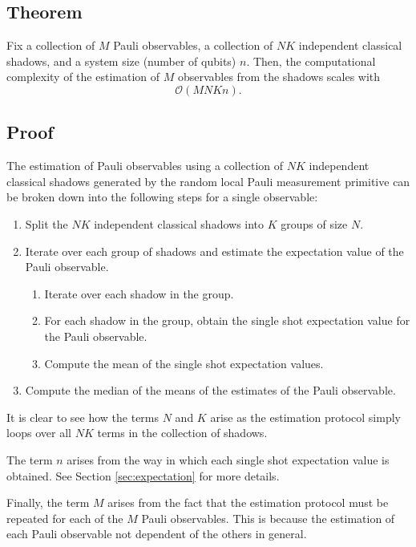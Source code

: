 \documentclass[12pt]{article}
\begin{document}
    \subsection{Theorem}
    Fix a collection of $M$ Pauli observables, a collection of $NK$ independent classical shadows, and a system size (number of qubits) $n$. Then, the computational complexity of the estimation of $M$ observables from the shadows scales with
    \begin{equation*}
        \mathcal{O}\left(MNKn\right).
    \end{equation*}

    \subsection{Proof}
    The estimation of Pauli observables using a collection of $NK$ independent classical shadows generated by the random local Pauli measurement primitive can be broken down into the following steps for a single observable:
    \begin{enumerate}
        \item Split the $NK$ independent classical shadows into $K$ groups of size $N$.
        \item Iterate over each group of shadows and estimate the expectation value of the Pauli observable.
        \begin{enumerate}
            \item Iterate over each shadow in the group.
            \item For each shadow in the group, obtain the single shot expectation value for the Pauli observable.
            \item Compute the mean of the single shot expectation values.
        \end{enumerate}
        \item Compute the median of the means of the estimates of the Pauli observable.
    \end{enumerate}

    It is clear to see how the terms $N$ and $K$ arise as the estimation protocol simply loops over all $NK$ terms in the collection of shadows.

    The term $n$ arises from the way in which each single shot expectation value is obtained. See Section \ref{sec:expectation} for more details.

    Finally, the term $M$ arises from the fact that the estimation protocol must be repeated for each of the $M$ Pauli observables. This is because the estimation of each Pauli observable not dependent of the others in general.
\end{document}
